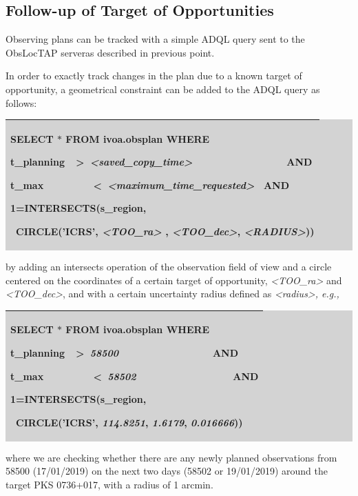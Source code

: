 \documentclass[11pt,a4paper]{ivoa}
\begin{document}
\subsection{Follow-up of Target of Opportunities}
Observing plans can be tracked with a simple ADQL query sent to the ObsLocTAP serveras 
described in previous point.
\par

In order to exactly track changes in the plan due to a known target of opportunity, a 
geometrical constraint can be added to the ADQL query as follows:

\bigskip
\par
\begingroup\setlength{\fboxsep}{0pt}
\colorbox{lightgray}{%
\begin{tabular}{|p{5.53in}|}
\hline
SELECT $\ast$  FROM ivoa.obsplan WHERE  \par  t\_planning\ \ >\   \textit{<saved\_copy\_time>}\ \ \ \ \ \ \ \ \ \ \ \ \ \ \ \ \  AND  \par  t\_max\ \ \ \ \ \ \ \ \ <\   \textit{<maximum\_time\_requested> }\  AND \par  1=INTERSECTS(s\_region, \par \  CIRCLE('ICRS', \textit{<TOO\_ra>} , \textit{<TOO\_dec>}, \textit{<RADIUS>})) \\
\hline
\end{tabular}%
}\endgroup
\par
\bigskip

by adding an intersects operation of the observation field of view and a circle centered on the coordinates of a certain target of opportunity, \textit{<TOO\_ra>} and \textit{<TOO\_dec>}, and with a certain uncertainty radius defined as \textit{<radius>, e.g.,}

\bigskip
\par
\begingroup\setlength{\fboxsep}{0pt}
\colorbox{lightgray}{%
\begin{tabular}{|p{5.53in}|}
\hline
SELECT $\ast$  FROM ivoa.obsplan WHERE  \par  t\_planning\ \ >\   \textit{58500}\ \ \ \ \ \ \ \ \ \ \ \ \ \ \ \ \  AND  \par  t\_max\ \ \ \ \ \ \ \ \ <\   \textit{58502\ \ \ \ \ \ \ \ \ \ \ \ \ \ \ \ \  }AND \par  1=INTERSECTS(s\_region, \par \  CIRCLE('ICRS', \textit{114.8251}, \textit{1.6179}, \textit{0.016666})) \\
\hline
\end{tabular}%
}\endgroup
\par
\bigskip
where we are checking whether there are any newly planned observations from 58500 (17/01/2019) on the next two days (58502 or 19/01/2019) around the target PKS 0736+017, with a radius of 1 arcmin.
\par
\end{document}
